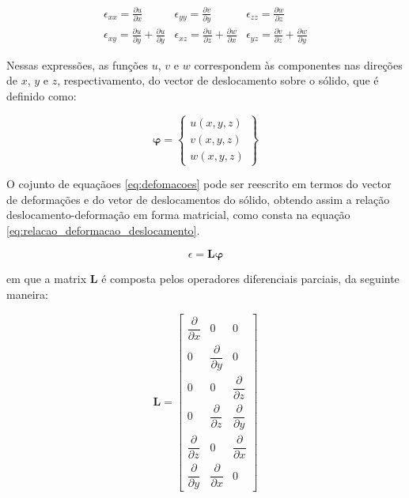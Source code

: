 \begin{equation} \label{eq:defomacoes}
    \begin{matrix}
        \epsilon_{xx} = \frac{\partial u}{\partial x} &
        \epsilon_{yy} = \frac{\partial v}{\partial y} &
        \epsilon_{zz} = \frac{\partial w}{\partial z} \\
        \epsilon_{xy} = \frac{\partial u}{\partial y} + \frac{\partial u}{\partial y} &
        \epsilon_{xz} = \frac{\partial u}{\partial z} + \frac{\partial w}{\partial x} &
        \epsilon_{yz} = \frac{\partial v}{\partial z} + \frac{\partial w}{\partial y}
    \end{matrix}
\end{equation}

Nessas expressões, as funções $u$, $v$ e $w$ correspondem às componentes nas direções de $x$, $y$ e $z$, respectivamento, do vector de deslocamento sobre o sólido, que é definido como:

\begin{equation}
    \mathbf{\varphi} = \begin{Bmatrix}
        u(x,y,z) \\
        v(x,y,z) \\
        w(x,y,z)
    \end{Bmatrix}
\end{equation}

O cojunto de equaçãoes \ref{eq:defomacoes} pode ser reescrito em termos do vector de deformações e do vetor de deslocamentos do sólido, obtendo assim a relação deslocamento-deformação em forma matricial, como consta na equação \ref{eq:relacao_deformacao_deslocamento}.

\begin{equation} \label{eq:relacao_deformacao_deslocamento}
    \epsilon = \mathbf{L} \mathbf{\varphi}
\end{equation}

em que a matrix $\mathbf{L}$ é composta pelos operadores diferenciais parciais, da seguinte maneira:

\begin{equation}
    \mathbf{L} = \begin{bmatrix}
        \dfrac{\partial}{\partial x} & 0 & 0 \\
        0 & \dfrac{\partial}{\partial y} & 0 \\
        0 & 0 & \dfrac{\partial}{\partial z} \\
        0 & \dfrac{\partial}{\partial z} & \dfrac{\partial}{\partial y} \\
        \dfrac{\partial}{\partial z} & 0 & \dfrac{\partial}{\partial x} \\
        \dfrac{\partial}{\partial y} & \dfrac{\partial}{\partial x} & 0
    \end{bmatrix}
\end{equation}


